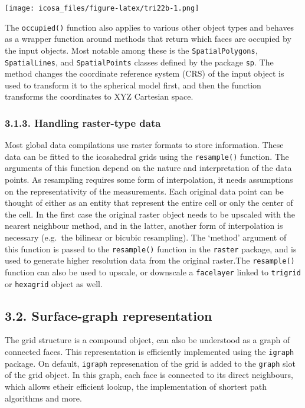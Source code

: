 \documentclass[]{article}
\begin{document}
\texttt{[image: icosa\_files/figure-latex/tri22b-1.png]}

The \texttt{occupied()} function also applies to various other object
types and behaves as a wrapper function around methods that return which
faces are occupied by the input objects. Most notable among these is the
\texttt{SpatialPolygons}, \texttt{SpatialLines}, and
\texttt{SpatialPoints} classes defined by the package \texttt{sp}. The
method changes the coordinate reference system (CRS) of the input object
is used to transform it to the spherical model first, and then the
function transforms the coordinates to XYZ Cartesian space.

\subsubsection{3.1.3. Handling raster-type
data}\label{handling-raster-type-data}

Most global data compilations use raster formats to store information.
These data can be fitted to the icosahedral grids using the
\texttt{resample()} function. The arguments of this function depend on
the nature and interpretation of the data points. As resampling requires
some form of interpolation, it needs assumptions on the representativity
of the measurements. Each original data point can be thought of either
as an entity that represent the entire cell or only the center of the
cell. In the first case the original raster object needs to be upscaled
with the nearest neighbour method, and in the latter, another form of
interpolation is necessary (e.g.~the bilinear or bicubic resampling).
The `method' argument of this function is passed to the
\texttt{resample()} function in the \texttt{raster} package, and is used
to generate higher resolution data from the original raster.The
\texttt{resample()} function can also be used to upscale, or downscale a
\texttt{facelayer} linked to \texttt{trigrid} or \texttt{hexagrid}
object as well.

\subsection{3.2. Surface-graph
representation}\label{surface-graph-representation}

The grid structure is a compound object, can also be understood as a
graph of connected faces. This representation is efficiently implemented
using the \texttt{igraph} package. On default, \texttt{igraph}
represenation of the grid is added to the \texttt{graph} slot of the
grid object. In this graph, each face is connected to its direct
neighbours, which allows etheir efficient lookup, the implementation of
shortest path algorithms and more.
\end{document}
